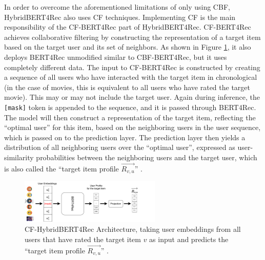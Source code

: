 \documentclass{Academic}
\begin{document}
        In order to overcome the aforementioned limitations of only using CBF, HybridBERT4Rec also uses CF techniques. Implementing CF is the main responsibility of the CF-BERT4Rec part of HybridBERT4Rec. CF-BERT4Rec achieves collaborative filtering by constructing the representation of a target item based on the target user and its set of neighbors. As shown in Figure \ref{fig:cf-arch}, it also deploys BERT4Rec unmodified similar to CBF-BERT4Rec, but it uses completely different data. The input to CF-BERT4Rec is constructed by creating a sequence of all users who have interacted with the target item in chronological (in the case of movies, this is equivalent to all users who have rated the target movie). This may or may not include the target user. Again during inference, the \texttt{[mask]} token is appended to the sequence, and it is passed through BERT4Rec. The model will then construct a representation of the target item, reflecting the \enquote{optimal user} for this item, based on the neighboring users in the user sequence, which is passed on to the prediction layer. The prediction layer then yields a distribution of all neighboring users over the \enquote{optimal user}, expressed as user-similarity probabilities between the neighboring users and the target user, which is also called the \enquote{target item profile $\overrightarrow{R_{v,u}}$} \cite{channarongHybridBERT4RecHybridContentBased2022}.
        \begin{figure}[ht!]
            \centering
            \includegraphics[width=0.6\textwidth]{images/CF-HybridBERT4Rec.pdf}
            \caption{CF-HybridBERT4Rec Architecture, taking user embeddings from all users that have rated the target item $v$ as input and predicts the \enquote{target item profile $\overrightarrow{R_{v,u}}$} \cite{channarongHybridBERT4RecHybridContentBased2022}.}
            \label{fig:cf-arch}
        \end{figure} \\
\end{document}
